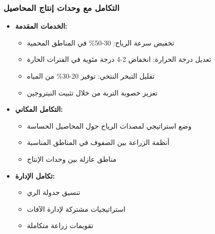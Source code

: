 \subsubsection{التكامل مع وحدات إنتاج المحاصيل}
\begin{itemize}
    \item \textbf{الخدمات المقدمة:}
    \begin{itemize}
        \item تخفيض سرعة الرياح: 30-50\% في المناطق المحمية
        \item تعديل درجة الحرارة: انخفاض 2-4 درجة مئوية في الفترات الحارة
        \item تقليل التبخر النتحي: توفير 20-30\% من المياه
        \item تعزيز خصوبة التربة من خلال تثبيت النيتروجين
    \end{itemize}
    \item \textbf{التكامل المكاني:}
    \begin{itemize}
        \item وضع استراتيجي لمصدات الرياح حول المحاصيل الحساسة
        \item أنظمة الزراعة بين الصفوف في المناطق المناسبة
        \item مناطق عازلة بين وحدات الإنتاج
    \end{itemize}
    \item \textbf{تكامل الإدارة:}
    \begin{itemize}
        \item تنسيق جدولة الري
        \item استراتيجيات مشتركة لإدارة الآفات
        \item تقويمات زراعة متكاملة
    \end{itemize}
\end{itemize}

